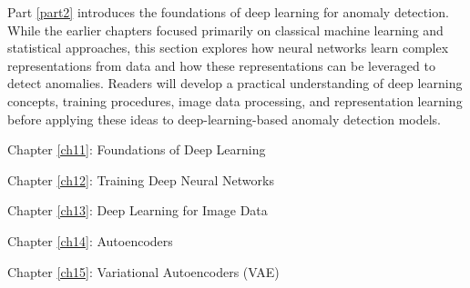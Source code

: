 \label{part2}
Part \ref{part2} introduces the foundations of deep learning for anomaly detection. While the earlier chapters focused primarily on classical machine learning and statistical approaches, this section explores how neural networks learn complex representations from data and how these representations can be leveraged to detect anomalies. Readers will develop a practical understanding of deep learning concepts, training procedures, image data processing, and representation learning before applying these ideas to deep-learning-based anomaly detection models.

\begin{description}[leftmargin=1cm, labelindent=1cm, labelwidth=1cm, align=right, itemsep=0pt, font=\normalfont]
    \item Chapter \ref{ch11}: Foundations of Deep Learning
    \item Chapter \ref{ch12}: Training Deep Neural Networks
    \item Chapter \ref{ch13}: Deep Learning for Image Data
    \item Chapter \ref{ch14}: Autoencoders
    \item Chapter \ref{ch15}: Variational Autoencoders (VAE)
\end{description}